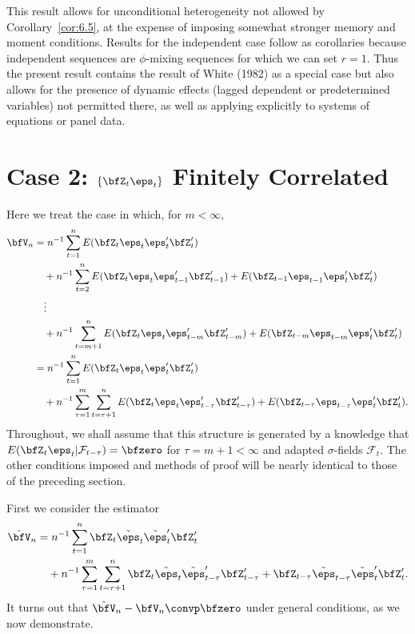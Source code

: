 This result allows for unconditional heterogeneity not allowed by Corollary~\ref{cor:6.5}, at the expense of imposing somewhat stronger memory and moment conditions. Results for the independent case follow as corollaries because independent sequences are $\phi$-mixing sequences for which we can set $r = 1$. Thus the present result contains the result of White (1982) as a special case but also allows for the presence of dynamic effects (lagged dependent or predetermined variables) not permitted there, as well as applying explicitly to systems of equations or panel data.

\section{Case 2: \texorpdfstring{$\{\bfZ_t\eps_t\}$}{Zt et} Finitely Correlated}\label{sec:case2}

Here we treat the case in which, for $m < \infty$,
\begin{align*}
  \bfV_n &= n^{-1}\sum_{t=1}^{n}E(\bfZ_t\eps_t\eps_t'\bfZ_t') \\
    &\quad + n^{-1}\sum_{t=2}^{n}E(\bfZ_t\eps_t\eps_{t-1}'\bfZ_{t-1}') + E(\bfZ_{t-1}\eps_{t-1}\eps_t'\bfZ_t') \\
    &\quad\vdots \\
    &\quad + n^{-1}\sum_{t=m+1}^{n}E(\bfZ_t\eps_t\eps_{t-m}'\bfZ_{t-m}') + E(\bfZ_{t-m}\eps_{t-m}\eps_t'\bfZ_t') \\
  &= n^{-1}\sum_{t=1}^{n}E(\bfZ_t\eps_t\eps_t'\bfZ_t') \\
    &\quad + n^{-1}\sum_{\tau=1}^{m}\sum_{t=\tau+1}^{n}E(\bfZ_t\eps_t\eps_{t-\tau}'\bfZ_{t-\tau}') + E(\bfZ_{t-\tau}\eps_{t-\tau}\eps_t'\bfZ_t').
\end{align*}
Throughout, we shall assume that this structure is generated by a knowledge that $E(\bfZ_t\eps_t|\mathcal{F}_{t-\tau}) = \bfzero$ for $\tau = m+1 < \infty$ and adapted $\sigma$-fields $\mathcal{F}_t$. The other conditions imposed and methods of proof will be nearly identical to those of the preceding section.

First we consider the estimator
\begin{align*}
  \hat{\bfV}_n &= n^{-1}\sum_{t=1}^{n}\bfZ_t\tilde{\eps}_t\tilde{\eps}_t'\bfZ_t' \\
    &\quad + n^{-1}\sum_{\tau=1}^{m}\sum_{t=\tau+1}^{n}\bfZ_t\tilde{\eps}_t\tilde{\eps}_{t-\tau}'\bfZ_{t-\tau}' + \bfZ_{t-\tau}\tilde{\eps}_{t-\tau}\tilde{\eps}_t'\bfZ_t'.
\end{align*}
It turns out that $\hat{\bfV}_n - \bfV_n \convp \bfzero$ under general conditions, as we now demonstrate.

